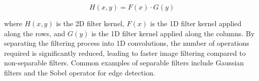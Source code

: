 \begin{equation}
H(x, y) = F(x) \cdot G(y)
\end{equation}

where \(H(x,y)\) is the 2D filter kernel, \(F(x)\) is the 1D filter kernel applied along the rows, and \(G(y)\) is the 1D filter kernel applied along the columns. By separating the filtering process into 1D convolutions, the number of operations required is significantly reduced, leading to faster image filtering compared to non-separable filters. Common examples of separable filters include Gaussian filters and the Sobel operator for edge detection.





